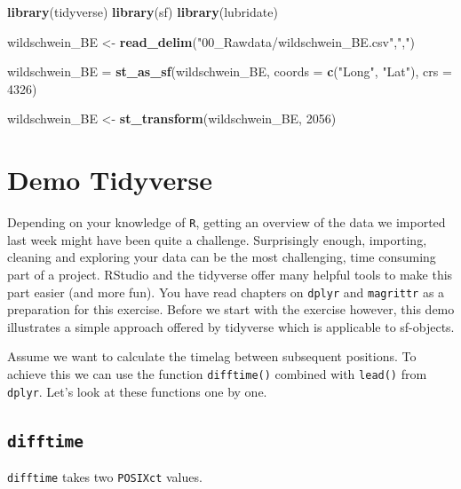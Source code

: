 \documentclass[]{book}
\newenvironment{Shaded}{\begin{snugshade}}{\end{snugshade}}
\newcommand{\DataTypeTok}[1]{\textcolor[rgb]{0.13,0.29,0.53}{#1}}
\newcommand{\DecValTok}[1]{\textcolor[rgb]{0.00,0.00,0.81}{#1}}
\newcommand{\KeywordTok}[1]{\textcolor[rgb]{0.13,0.29,0.53}{\textbf{#1}}}
\newcommand{\NormalTok}[1]{#1}
\newcommand{\StringTok}[1]{\textcolor[rgb]{0.31,0.60,0.02}{#1}}
\begin{document}
\begin{Shaded}
\begin{Highlighting}[]
\KeywordTok{library}\NormalTok{(tidyverse)}
\KeywordTok{library}\NormalTok{(sf)}
\KeywordTok{library}\NormalTok{(lubridate)}

\NormalTok{wildschwein_BE <-}\StringTok{ }\KeywordTok{read_delim}\NormalTok{(}\StringTok{"00_Rawdata/wildschwein_BE.csv"}\NormalTok{,}\StringTok{","}\NormalTok{)}

\NormalTok{wildschwein_BE =}\StringTok{ }\KeywordTok{st_as_sf}\NormalTok{(wildschwein_BE, }\DataTypeTok{coords =} \KeywordTok{c}\NormalTok{(}\StringTok{"Long"}\NormalTok{, }\StringTok{"Lat"}\NormalTok{), }\DataTypeTok{crs =} \DecValTok{4326}\NormalTok{)}

\NormalTok{wildschwein_BE <-}\StringTok{ }\KeywordTok{st_transform}\NormalTok{(wildschwein_BE, }\DecValTok{2056}\NormalTok{)}
\end{Highlighting}
\end{Shaded}

\hypertarget{demo-tidyverse}{%
\section{Demo Tidyverse}\label{demo-tidyverse}}

Depending on your knowledge of \texttt{R}, getting an overview of the data we imported last week might have been quite a challenge. Surprisingly enough, importing, cleaning and exploring your data can be the most challenging, time consuming part of a project. RStudio and the tidyverse offer many helpful tools to make this part easier (and more fun). You have read chapters on \texttt{dplyr} and \texttt{magrittr} as a preparation for this exercise. Before we start with the exercise however, this demo illustrates a simple approach offered by tidyverse which is applicable to sf-objects.

Assume we want to calculate the timelag between subsequent positions. To achieve this we can use the function \texttt{difftime()} combined with \texttt{lead()} from \texttt{dplyr}. Let's look at these functions one by one.

\hypertarget{difftime}{%
\subsection{\texorpdfstring{\texttt{difftime}}{difftime}}\label{difftime}}

\texttt{difftime} takes two \texttt{POSIXct} values.
\end{document}
